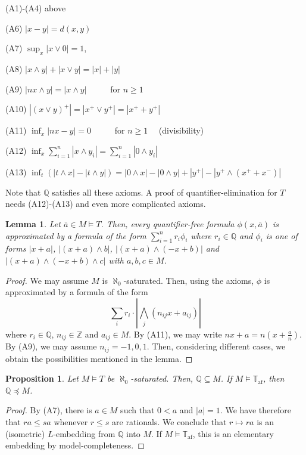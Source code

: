 \documentclass[12pt]{article}
\newtheorem{lemma}[theorem]{Lemma}
\newtheorem{proposition}[theorem]{Proposition}
\def\a{\bar{a}}\def\b{\bar{b}}\def\c{\bar{c}}
\def\Zn{\mathbb Z}
\def\Qn{\mathbb Q}
\begin{document}
(A1)-(A4) above

(A6) $|x-y|=d(x,y)$

(A7) $\sup_x|x\vee0|=1$,

(A8) $|x\wedge y|+|x\vee y|=|x|+|y|$

(A9) $|nx\wedge y|=|x\wedge y|$ \ \ \ \ \ for $n\geqslant1$

(A10) $|(x\vee y)^+|=|x^+\vee y^+|=|x^++y^+|$

(A11) $\inf_x|nx-y|=0$ \ \ \ \ \ for $n\geqslant1$ \ \ (divisibility)

(A12) $\inf_x\sum_{i=1}^n|x\wedge y_i|=\sum_{i=1}^n|0\wedge y_i|$

(A13) $\inf_t(|t\wedge x|-|t\wedge y|)=|0\wedge x|-|0\wedge y|+|y^+|-|y^+\wedge(x^+ + x^-)|$
\bigskip

Note that $\Qn$ satisfies all these axioms. A proof of quantifier-elimination for $T$
needs (A12)-(A13) and even more complicated axioms.

\begin{lemma}
Let $\a\in M\vDash T$. Then, every quantifier-free formula $\phi(x,\a)$ is
approximated by a formula of the form $\sum_{i=1}^nr_i\phi_i$ where $r_i\in\Qn$ and $\phi_i$
is one of forms $|x+a|$, $|(x+a)\wedge b|$, $|(x+a)\wedge(-x+b)|$ and $|(x+a)\wedge(-x+b)\wedge c|$ with $a,b,c\in M$.
\end{lemma}
\begin{proof}
We may assume $M$ is $\aleph_0$-saturated. Then, using the axioms, $\phi$ is approximated by a formula of the form
$$\sum_ir_i\cdot|\bigwedge_{j}(n_{ij}x+a_{ij})|$$ where $r_i\in\Qn$, $n_{ij}\in\Zn$ and $a_{ij}\in M$.
By (A11), we may write $nx+a=n(x+\frac{a}{n})$. By (A9), we may assume $n_{ij}=-1,0,1$.
Then, considering different cases, we obtain the possibilities mentioned in the lemma.
\end{proof}

\begin{proposition}
Let $M\vDash T$ be $\aleph_0$-saturated. Then, $\Qn\subseteq M$. If $M\vDash\mathbb{T}_{\textrm{af}}$, then $\Qn\preccurlyeq M$.
\end{proposition}
\begin{proof}
By (A7), there is $a\in M$ such that $0<a$ and $|a|=1$.
We have therefore that $ra\leqslant sa$ whenever $r\leqslant s$ are rationals.
We conclude that $r\mapsto ra$ is an (isometric) $L$-embedding from $\Qn$ into $M$.
If $M\vDash\mathbb{T}_{\textrm{af}}$, this is an elementary embedding by model-completeness.
\end{proof}
\bigskip
\end{document}
